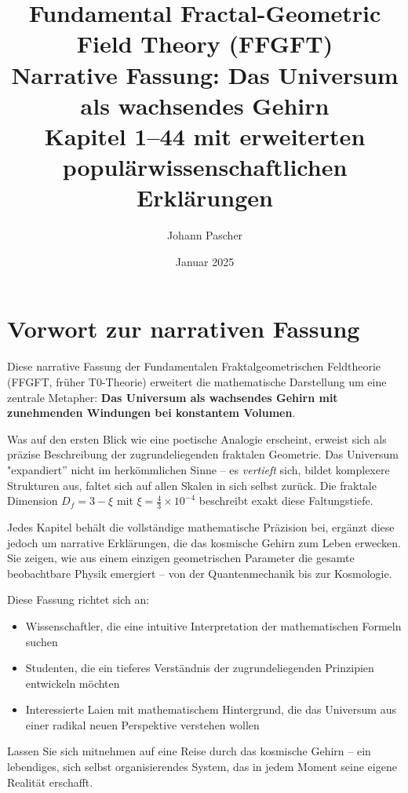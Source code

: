 \documentclass[12pt]{book}
\title{%
	\textbf{Fundamental Fractal-Geometric Field Theory (FFGFT)} \\
	\Large Narrative Fassung: Das Universum als wachsendes Gehirn \\
	\normalsize Kapitel 1--44 mit erweiterten populärwissenschaftlichen Erklärungen
}
\author{Johann Pascher}
\date{Januar 2025}
\begin{document}
\maketitle

\tableofcontents



\chapter*{Vorwort zur narrativen Fassung}

Diese narrative Fassung der Fundamentalen Fraktalgeometrischen Feldtheorie (FFGFT, früher T0-Theorie) erweitert die mathematische Darstellung um eine zentrale Metapher: \textbf{Das Universum als wachsendes Gehirn mit zunehmenden Windungen bei konstantem Volumen}.

Was auf den ersten Blick wie eine poetische Analogie erscheint, erweist sich als präzise Beschreibung der zugrundeliegenden fraktalen Geometrie. Das Universum "expandiert'' nicht im herkömmlichen Sinne – es \textit{vertieft} sich, bildet komplexere Strukturen aus, faltet sich auf allen Skalen in sich selbst zurück. Die fraktale Dimension $D_f = 3 - \xi$ mit $\xi = \frac{4}{3} \times 10^{-4}$ beschreibt exakt diese Faltungstiefe.

Jedes Kapitel behält die vollständige mathematische Präzision bei, ergänzt diese jedoch um narrative Erklärungen, die das kosmische Gehirn zum Leben erwecken. Sie zeigen, wie aus einem einzigen geometrischen Parameter die gesamte beobachtbare Physik emergiert – von der Quantenmechanik bis zur Kosmologie.

Diese Fassung richtet sich an:
\begin{itemize}
	\item Wissenschaftler, die eine intuitive Interpretation der mathematischen Formeln suchen
	\item Studenten, die ein tieferes Verständnis der zugrundeliegenden Prinzipien entwickeln möchten
	\item Interessierte Laien mit mathematischem Hintergrund, die das Universum aus einer radikal neuen Perspektive verstehen wollen
\end{itemize}

Lassen Sie sich mitnehmen auf eine Reise durch das kosmische Gehirn – ein lebendiges, sich selbst organisierendes System, das in jedem Moment seine eigene Realität erschafft.
\end{document}
